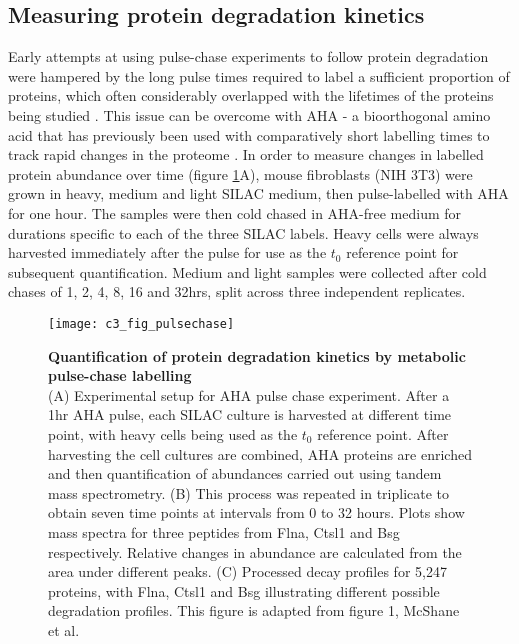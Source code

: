 \documentclass[a4paper,11pt,twoside,openright]{scrbook}
\begin{document}
\subsection{Measuring protein degradation kinetics}
Early attempts at using pulse-chase experiments to follow protein degradation were hampered by the long pulse times required to label a sufficient proportion of proteins, which often considerably overlapped with the lifetimes of the proteins being studied \cite{Larance2013}. This issue can be overcome with AHA - a bioorthogonal amino acid that has previously been used with comparatively short labelling times to track rapid changes in the proteome \cite{Eichelbaum2014}. In order to measure changes in labelled protein abundance over time (figure \ref{figure:pulsechase}A), mouse fibroblasts (NIH 3T3) were grown in heavy, medium and light SILAC medium, then pulse-labelled with AHA for one hour. The samples were then cold chased in AHA-free medium for durations specific to each of the three SILAC labels. Heavy cells were always harvested immediately after the pulse for use as the $t_{0}$ reference point for subsequent quantification. Medium and light samples were collected after cold chases of 1, 2, 4, 8, 16 and 32hrs, split across three independent replicates.

\begin{figure}
    \texttt{[image: c3\_fig\_pulsechase]}
    \caption[Quantification of protein degradation kinetics by metabolic pulse-chase labelling]{\sffamily \textbf{Quantification of protein degradation kinetics by metabolic pulse-chase labelling} \\ \small (A) Experimental setup for AHA pulse chase experiment. After a 1hr AHA pulse, each SILAC culture is harvested at different time point, with heavy cells being used as the $t_{0}$ reference point. After harvesting the cell cultures are combined, AHA proteins are enriched and then quantification of abundances carried out using tandem mass spectrometry. (B) This process was repeated in triplicate to obtain seven time points at intervals from 0 to 32 hours. Plots show mass spectra for three peptides from Flna, Ctsl1 and Bsg respectively. Relative changes in abundance are calculated from the area under different peaks. (C) Processed decay profiles for 5,247 proteins, with Flna, Ctsl1 and Bsg illustrating different possible degradation profiles. This figure is adapted from figure 1, McShane et al.\cite{McShane2016}}
    \label{figure:pulsechase}
\end{figure}
\end{document}
